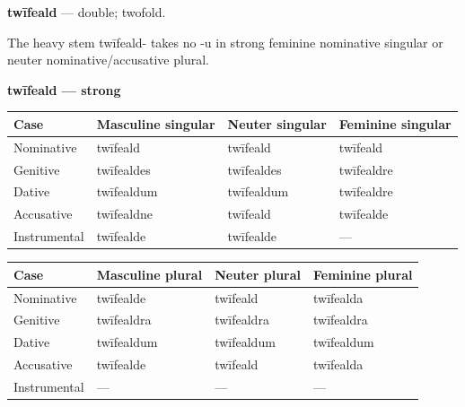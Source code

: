 \par\begin{minipage}{\linewidth}\raggedright
\textbf{twīfeald} — double; twofold.

The heavy stem twīfeald- takes no -u in strong feminine nominative singular or neuter nominative/\allowbreak{}accusative plural.

\textbf{twīfeald — strong}

\par\begingroup
\fontsize{10.5}{13.2}\selectfont
\setlength{\LTleft}{0pt}\setlength{\LTright}{\fill}
\noindent
\begin{tabular}{@{}>{\raggedright\arraybackslash}p{22.0mm}>{\raggedright\arraybackslash}p{31.188mm}>{\raggedright\arraybackslash}p{31.188mm}>{\raggedright\arraybackslash}p{31.188mm}@{}}
\toprule
\textbf{Case} & \textbf{Masculine singular} & \textbf{Neuter singular} & \textbf{Feminine singular} \\
\midrule
Nominative & twīfeald & twīfeald & twīfeald \\
Genitive & twīfealdes & twīfealdes & twīfealdre \\
Dative & twīfealdum & twīfealdum & twīfealdre \\
Accusative & twīfealdne & twīfeald & twīfealde \\
Instrumental & twīfealde & twīfealde & — \\
\bottomrule
\end{tabular}
\par\endgroup
\end{minipage}\par
\par\addvspace{5pt}
\par\begingroup
\fontsize{10.5}{13.2}\selectfont
\setlength{\LTleft}{0pt}\setlength{\LTright}{\fill}
\noindent
\begin{tabular}{@{}>{\raggedright\arraybackslash}p{22.0mm}>{\raggedright\arraybackslash}p{31.188mm}>{\raggedright\arraybackslash}p{31.188mm}>{\raggedright\arraybackslash}p{31.188mm}@{}}
\toprule
\textbf{Case} & \textbf{Masculine plural} & \textbf{Neuter plural} & \textbf{Feminine plural} \\
\midrule
Nominative & twīfealde & twīfeald & twīfealda \\
Genitive & twīfealdra & twīfealdra & twīfealdra \\
Dative & twīfealdum & twīfealdum & twīfealdum \\
Accusative & twīfealde & twīfeald & twīfealda \\
Instrumental & — & — & — \\
\bottomrule
\end{tabular}
\par\endgroup

